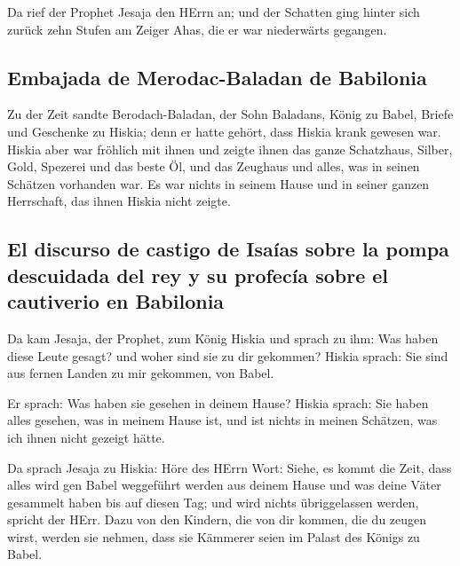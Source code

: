  Da rief der Prophet Jesaja den HErrn an; und der
Schatten ging hinter sich zurück zehn Stufen am Zeiger Ahas, die er war
niederwärts gegangen.

\hypertarget{embajada-de-merodac-baladan-de-babilonia}{%
\subsection{Embajada de Merodac-Baladan de
Babilonia}\label{embajada-de-merodac-baladan-de-babilonia}}

 Zu der Zeit sandte Berodach-Baladan, der Sohn Baladans,
König zu Babel, Briefe und Geschenke zu Hiskia; denn er hatte gehört,
dass Hiskia krank gewesen war.  Hiskia aber war fröhlich
mit ihnen und zeigte ihnen das ganze Schatzhaus, Silber, Gold, Spezerei
und das beste Öl, und das Zeughaus und alles, was in seinen Schätzen
vorhanden war. Es war nichts in seinem Hause und in seiner ganzen
Herrschaft, das ihnen Hiskia nicht zeigte.

\hypertarget{el-discurso-de-castigo-de-isauxedas-sobre-la-pompa-descuidada-del-rey-y-su-profecuxeda-sobre-el-cautiverio-en-babilonia}{%
\subsection{El discurso de castigo de Isaías sobre la pompa descuidada
del rey y su profecía sobre el cautiverio en
Babilonia}\label{el-discurso-de-castigo-de-isauxedas-sobre-la-pompa-descuidada-del-rey-y-su-profecuxeda-sobre-el-cautiverio-en-babilonia}}

 Da kam Jesaja, der Prophet, zum König Hiskia und sprach
zu ihm: Was haben diese Leute gesagt? und woher sind sie zu dir
gekommen? Hiskia sprach: Sie sind aus fernen Landen zu mir gekommen, von
Babel.

 Er sprach: Was haben sie gesehen in deinem Hause? Hiskia
sprach: Sie haben alles gesehen, was in meinem Hause ist, und ist nichts
in meinen Schätzen, was ich ihnen nicht gezeigt hätte.

 Da sprach Jesaja zu Hiskia: Höre des HErrn Wort:
 Siehe, es kommt die Zeit, dass alles wird gen Babel
weggeführt werden aus deinem Hause und was deine Väter gesammelt haben
bis auf diesen Tag; und wird nichts übriggelassen werden, spricht der
HErr.  Dazu von den Kindern, die von dir kommen, die du
zeugen wirst, werden sie nehmen, dass sie Kämmerer seien im Palast des
Königs zu Babel.

